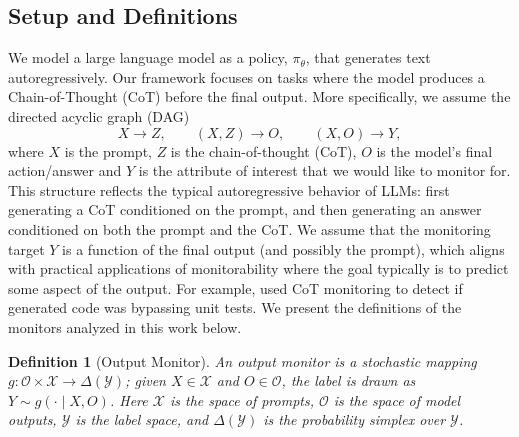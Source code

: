 \documentclass{article}
\theoremstyle{plain}
\newtheorem{definition}[theorem]{Definition}
\begin{document}
\subsection{Setup and Definitions}
We model a large language model as a policy, $\pi_\theta$, that generates text autoregressively.
Our framework focuses on tasks where the model produces a Chain-of-Thought (CoT) before the final output.
More specifically, we assume the directed acyclic graph (DAG)
\[
X \to Z,\qquad (X,Z)\to O,\qquad (X,O)\to Y,
\]
where \(X\) is the prompt, \(Z\) is the chain-of-thought (CoT), \(O\) is the model's final action/answer and $Y$ is the attribute of interest that we would like to monitor for. 
This structure reflects the typical autoregressive behavior of LLMs: first generating a CoT conditioned on the prompt, and then generating an answer conditioned on both the prompt and the CoT.
We assume that the monitoring target $Y$ is a function of the final output (and possibly the prompt), which aligns with practical applications of monitorability where the goal typically is to predict some aspect of the output. 
For example, \citet{baker2025monitoringreasoningmodelsmisbehavior} used CoT monitoring to detect if generated code was bypassing unit tests.
We present the definitions of the monitors analyzed in this work below.



\begin{definition}[Output Monitor]
An output \emph{monitor} is a stochastic mapping \(g:\mathcal{O}\times\mathcal{X}\to\Delta(\mathcal{Y})\); given \(X\in\mathcal{X}\) and \(O\in\mathcal{O}\), the label is drawn as \(Y\sim g(\cdot\mid X,O)\). Here \(\mathcal{X}\) is the space of prompts, \(\mathcal{O}\) is the space of model outputs, \(\mathcal{Y}\) is the label space, and \(\Delta(\mathcal{Y})\) is the probability simplex over \(\mathcal{Y}\).
\end{definition}

\end{document}
